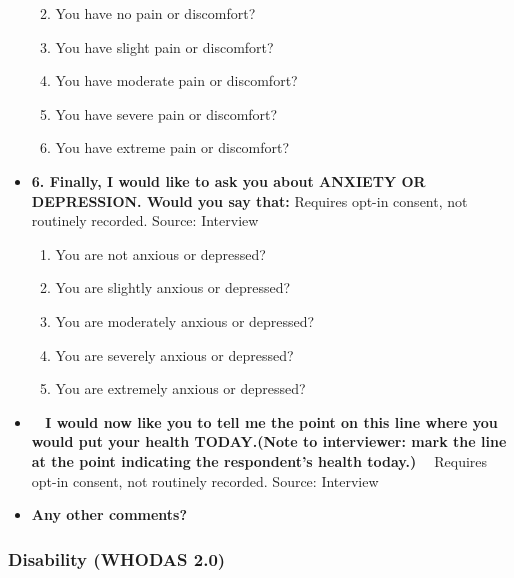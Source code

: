 \documentclass[
]{scrartcl}
\providecommand{\tightlist}{%
  \setlength{\itemsep}{0pt}\setlength{\parskip}{0pt}}\usepackage{longtable,booktabs,array}
\begin{document}
\begin{itemize}
  \begin{enumerate}
  \def\labelenumi{\arabic{enumi}.}
  \tightlist
  \item
    You have no pain or discomfort?
  \item
    You have slight pain or discomfort?
  \item
    You have moderate pain or discomfort?
  \item
    You have severe pain or discomfort?
  \item
    You have extreme pain or discomfort?
  \end{enumerate}
\item
  \textbf{6. Finally, I would like to ask you about ANXIETY OR
  DEPRESSION. Would you say that:} Requires opt-in consent, not
  routinely recorded. Source: Interview

  \begin{enumerate}
  \def\labelenumi{\arabic{enumi}.}
  \tightlist
  \item
    You are not anxious or depressed?
  \item
    You are slightly anxious or depressed?
  \item
    You are moderately anxious or depressed?
  \item
    You are severely anxious or depressed?
  \item
    You are extremely anxious or depressed?
  \end{enumerate}
\item
  \textbf{~ I would now like you to tell me the point on this line where
  you would put your health TODAY.(Note to interviewer: mark the line at
  the point indicating the respondent's health today.) ~} Requires
  opt-in consent, not routinely recorded. Source: Interview
\item
  \textbf{Any other comments?}
\end{itemize}

\hypertarget{disability-whodas-2.0}{%
\subsubsection{Disability (WHODAS 2.0)}\label{disability-whodas-2.0}}
\end{document}
